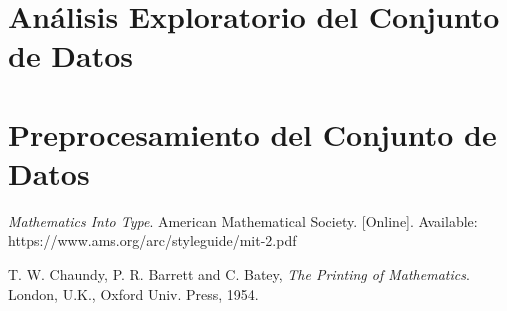 \documentclass[lettersize,journal]{IEEEtran}
\begin{document}
\section{Análisis Exploratorio del Conjunto de Datos}

\section{Preprocesamiento del Conjunto de Datos}


\begin{thebibliography}{1}


{\it{Mathematics Into Type}}. American Mathematical Society. [Online]. Available: https://www.ams.org/arc/styleguide/mit-2.pdf

T. W. Chaundy, P. R. Barrett and C. Batey, {\it{The Printing of Mathematics}}. London, U.K., Oxford Univ. Press, 1954.

\end{thebibliography}


\newpage



\vfill
\end{document}
